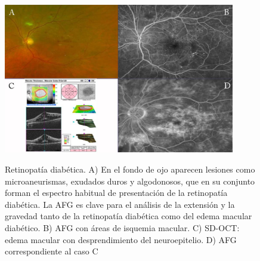 \begin{figure}[H]
\centering
\includegraphics[width=0.9\textwidth]{./Figures/RD_AF.png}
\label{fig:lightfilter}
\caption{ Retinopatía diabética. A) En el fondo de ojo aparecen lesiones como microaneurismas, exudados duros y algodonosos, que en su conjunto forman el espectro habitual de presentación de la retinopatía diabética. La AFG es clave para el análisis de la extensión y la gravedad tanto de la retinopatía diabética como del edema macular diabético. B) AFG con áreas de isquemia macular. C) SD-OCT: edema macular con desprendimiento del neuroepitelio. D) AFG correspondiente al caso C}
\end{figure}

